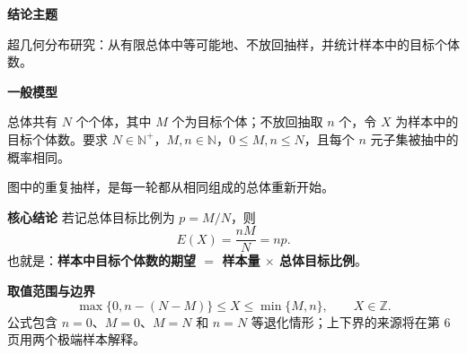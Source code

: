 \begin{statementbox}
	\textbf{\textcolor{CStatement}{结论主题}}

	超几何分布研究：从有限总体中等可能地、不放回抽样，并统计样本中的目标个体数。

	\medskip
	\textbf{\textcolor{CStatement}{一般模型}}

	总体共有 $N$ 个个体，其中 $M$ 个为目标个体；不放回抽取 $n$ 个，令 $X$ 为样本中的目标个体数。要求
	$N\in\mathbb{N}^{+}$，$M,n\in\mathbb{N}$，$0\le M,n\le N$，且每个 $n$ 元子集被抽中的概率相同。

	

	图中的重复抽样，是每一轮都从相同组成的总体重新开始。

	\medskip
	\textbf{\textcolor{CStatement}{核心结论}}
	若记总体目标比例为 $p=M/N$，则
	\[
		\boxed{E(X)=\frac{nM}{N}=np}.
	\]
	也就是：\textbf{样本中目标个体数的期望 $=$ 样本量 $\times$ 总体目标比例}。

	\medskip
	\textbf{\textcolor{CStatement}{取值范围与边界}}
	\[
		\max\{0,n-(N-M)\}\le X\le\min\{M,n\},
		\qquad X\in\mathbb{Z}.
	\]
	公式包含 $n=0$、$M=0$、$M=N$ 和 $n=N$ 等退化情形；上下界的来源将在第 $6$ 页用两个极端样本解释。
\end{statementbox}
